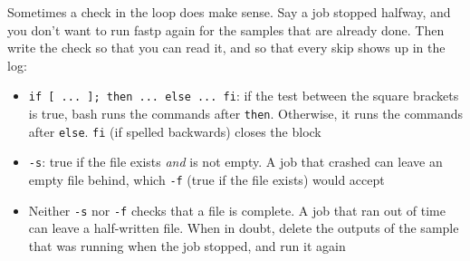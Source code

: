 \documentclass[
  letterpaper,
  DIV=11,
  numbers=noendperiod]{scrreprt}
\newenvironment{Shaded}{}{}
\newcommand{\BuiltInTok}[1]{\textcolor[rgb]{0.84,0.23,0.29}{#1}}
\newcommand{\ControlFlowTok}[1]{\textcolor[rgb]{0.84,0.23,0.29}{#1}}
\newcommand{\FunctionTok}[1]{\textcolor[rgb]{0.44,0.26,0.76}{#1}}
\newcommand{\KeywordTok}[1]{\textcolor[rgb]{0.84,0.23,0.29}{#1}}
\newcommand{\NormalTok}[1]{\textcolor[rgb]{0.14,0.16,0.18}{#1}}
\newcommand{\OtherTok}[1]{\textcolor[rgb]{0.44,0.26,0.76}{#1}}
\newcommand{\StringTok}[1]{\textcolor[rgb]{0.01,0.18,0.38}{#1}}
\newcommand{\VariableTok}[1]{\textcolor[rgb]{0.89,0.38,0.04}{#1}}
\providecommand{\tightlist}{%
  \setlength{\itemsep}{0pt}\setlength{\parskip}{0pt}}
\begin{document}
\begin{tcolorbox}[enhanced jigsaw, title=\textcolor{quarto-callout-tip-color}{\faLightbulb}\hspace{0.5em}{Tip: Skipping samples that are already done (optional)}, rightrule=.15mm, titlerule=0mm, colframe=quarto-callout-tip-color-frame, toprule=.15mm, leftrule=.75mm, colbacktitle=quarto-callout-tip-color!10!white, bottomtitle=1mm, toptitle=1mm, arc=.35mm, opacitybacktitle=0.6, left=2mm, bottomrule=.15mm, breakable, opacityback=0, colback=white, coltitle=black]

Sometimes a check in the loop does make sense. Say a job stopped
halfway, and you don't want to run fastp again for the samples that are
already done. Then write the check so that you can read it, and so that
every skip shows up in the log:

\begin{Shaded}
\end{Shaded}

\begin{itemize}
\tightlist
\item
  \texttt{if\ {[}\ ...\ {]};\ then\ ...\ else\ ...\ fi}: if the test
  between the square brackets is true, bash runs the commands after
  \texttt{then}. Otherwise, it runs the commands after \texttt{else}.
  \texttt{fi} (if spelled backwards) closes the block
\item
  \texttt{-s}: true if the file exists \emph{and} is not empty. A job
  that crashed can leave an empty file behind, which \texttt{-f} (true
  if the file exists) would accept
\item
  Neither \texttt{-s} nor \texttt{-f} checks that a file is complete. A
  job that ran out of time can leave a half-written file. When in doubt,
  delete the outputs of the sample that was running when the job
  stopped, and run it again
\end{itemize}


\end{tcolorbox}
\end{document}
